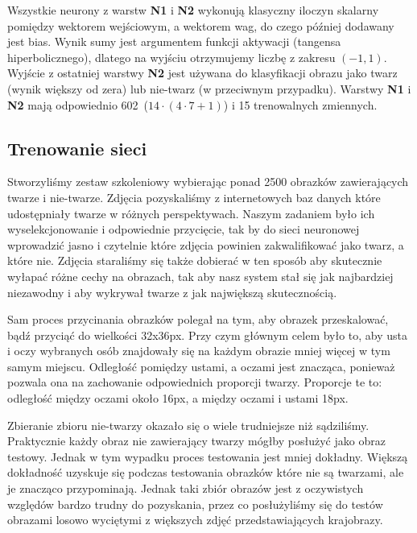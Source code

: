 \documentclass[11pt,a4paper]{article}
\begin{document}
Wszystkie neurony z warstw  \textbf{N1} i  \textbf{N2} wykonują klasyczny iloczyn skalarny pomiędzy 
wektorem wejściowym, a wektorem wag, do czego później dodawany jest bias. Wynik sumy jest argumentem
funkcji aktywacji (tangensa hiperbolicznego), dlatego na wyjściu otrzymujemy liczbę z zakresu 
$(-1,1)$. Wyjście z ostatniej warstwy  \textbf{N2} jest używana do klasyfikacji obrazu jako twarz 
(wynik większy od zera) lub nie-twarz (w przeciwnym przypadku). Warstwy  \textbf{N1} i  \textbf{N2} 
mają odpowiednio 602~($14 \cdot (4 \cdot 7 + 1)$) i 15 trenowalnych zmiennych.

\subsection{Trenowanie sieci}

Stworzyliśmy zestaw szkoleniowy wybierając ponad 2500 obrazków zawierających twarze i nie-twarze. 
Zdjęcia pozyskaliśmy z internetowych baz danych które udostępniały twarze w różnych perspektywach. 
Naszym zadaniem było ich wyselekcjonowanie i odpowiednie przycięcie, tak by do sieci neuronowej 
wprowadzić jasno i czytelnie które zdjęcia powinien zakwalifikować jako twarz, a które nie. Zdjęcia 
staraliśmy się także dobierać w ten sposób aby skutecznie wyłapać różne cechy na obrazach, tak aby 
nasz system stał się jak najbardziej niezawodny i aby wykrywał twarze z jak największą 
skutecznością.

Sam proces przycinania obrazków polegał na tym, aby obrazek przeskalować, bądź przyciąć do wielkości
32x36px. Przy czym głównym celem było to, aby usta i oczy wybranych osób znajdowały się na każdym 
obrazie mniej więcej w tym samym miejscu. Odległość pomiędzy ustami, a oczami jest znacząca, 
ponieważ pozwala ona na zachowanie odpowiednich proporcji twarzy. Proporcje te to: odległość między 
oczami około 16px, a między oczami i ustami 18px.

Zbieranie zbioru nie-twarzy okazało się o wiele trudniejsze niż sądziliśmy. Praktycznie każdy obraz 
nie zawierający twarzy mógłby posłużyć jako obraz testowy. Jednak w tym wypadku proces testowania 
jest mniej dokładny. Większą dokładność uzyskuje się podczas testowania obrazków które nie są 
twarzami, ale je znacząco przypominają. Jednak taki zbiór obrazów jest z oczywistych względów bardzo
trudny do pozyskania, przez co posłużyliśmy się do testów obrazami losowo wyciętymi z większych 
zdjęć przedstawiających krajobrazy. 
\end{document}
